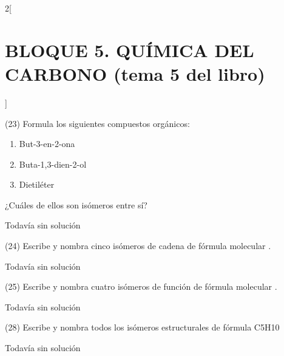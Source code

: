 \documentclass[10pt]{article}
\begin{document}
\begin{multicols}{2}[
  \section{BLOQUE 5. QUÍMICA DEL CARBONO (tema 5 del libro)}
  ]
\begin{exercise}[
    tags    = {},
    topics  = {química,química básica},
    source  = {FQ 1B MGH 2016, p85, e26},
  ]

  (23) Formula los siguientes compuestos orgánicos:
  \begin{enumerate}
    \item But-3-en-2-ona
    \item Buta-1,3-dien-2-ol
    \item Dietiléter
  \end{enumerate}
  ¿Cuáles de ellos son isómeros entre sí?
\end{exercise}

\begin{solution}[print=false]
  Todavía sin solución
\end{solution}




\begin{exercise}[
    tags    = {},
    topics  = {química,química básica},
    source  = {FQ 1B MGH 2016, p85, e26},
  ]

  (24) Escribe y nombra cinco isómeros de cadena de fórmula molecular .
\end{exercise}

\begin{solution}[print=false]
  Todavía sin solución
\end{solution}




\begin{exercise}[
    tags    = {},
    topics  = {química,química básica},
    source  = {FQ 1B MGH 2016, p85, e26},
  ]

  (25) Escribe y nombra cuatro isómeros de función de fórmula molecular .
\end{exercise}

\begin{solution}[print=false]
  Todavía sin solución
\end{solution}




\begin{exercise}[
    tags    = {},
    topics  = {química,química básica},
    source  = {FQ 1B MGH 2016, p85, e26},
  ]

  (28) Escribe y nombra todos los isómeros estructurales de fórmula C5H10
\end{exercise}

\begin{solution}[print=false]
  Todavía sin solución
\end{solution}





\end{multicols}
\end{document}
